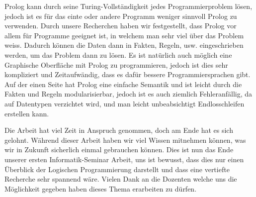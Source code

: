 \documentclass[a4paper, 12pt, DIV11, BCOR5mm, tikz]{scrartcl}
\begin{document}
\noindent
Prolog kann durch seine Turing-Vollständigkeit jedes Programmierproblem lösen, jedoch ist es für das einte oder andere Programm weniger sinnvoll Prolog zu verwenden. Durch unsere Recherchen haben wir festgestellt, dass Prolog vor allem für Programme geeignet ist, in welchem man sehr viel über das Problem weiss. Dadurch können die Daten dann in Fakten, Regeln, usw. eingeschrieben werden, um das Problem dann zu lösen. Es ist natürlich auch möglich eine Graphische Oberfläche mit Prolog zu programmieren, jedoch ist dies sehr kompliziert und Zeitaufwändig, dass es dafür bessere Programmiersprachen gibt. Auf der einen Seite hat Prolog eine einfache Semantik und ist leicht durch die Fakten und Regeln modularisierbar, jedoch ist es auch ziemlich Fehleranfällig, da auf Datentypen verzichtet wird,  und man leicht unbeabsichtigt Endlosschleifen erstellen kann.

\noindent
Die Arbeit hat viel Zeit in Anspruch genommen, doch am Ende hat es sich gelohnt.
Während dieser Arbeit haben wir viel Wissen mitnehmen können, was wir in Zukunft sicherlich einmal gebrauchen können.
Dies ist nun das Ende unserer ersten Informatik-Seminar Arbeit, uns ist bewusst, dass dies nur einen Überblick der Logischen Programmierung darstellt und dass eine vertiefte Recherche sehr spannend wäre.
Vielen Dank an die Dozenten welche uns die Möglichkeit gegeben haben dieses Thema erarbeiten zu dürfen.


\nocite{*}
\newpage
{}


\end{document}
